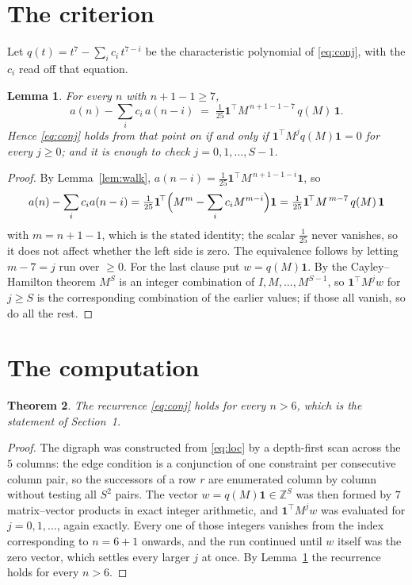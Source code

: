 \documentclass[11pt,a4paper]{article}
\theoremstyle{plain}
\newtheorem{theorem}{Theorem}
\newtheorem{lemma}[theorem]{Lemma}
\theoremstyle{definition}
\begin{document}
\section{The criterion}

Let $q(t)=t^{7}-\sum_i c_i\,t^{7-i}$ be the characteristic polynomial of
\eqref{eq:conj}, with the $c_i$ read off that equation.

\begin{lemma}\label{lem:crit}
For every $n$ with $n+1-1\ge7$,
\[
a(n)-\sum_i c_i\,a(n-i)\;=\;\tfrac1{25}\mathbf{1}^{\!\top}M^{\,n+1-1-7}\,q(M)\,\mathbf{1} .
\]
Hence \eqref{eq:conj} holds from that point on if and only if
$\mathbf{1}^{\!\top}M^{j}q(M)\mathbf{1}=0$ for every $j\ge0$; and it is enough to check
$j=0,1,\dots,S-1$.
\end{lemma}

\begin{proof}
By Lemma~\ref{lem:walk}, $a(n-i)=\tfrac1{25}\mathbf{1}^{\!\top}M^{\,n+1-1-i}\mathbf{1}$, so
\[
a(n)-\sum_i c_i a(n-i)
=\tfrac1{25}\mathbf{1}^{\!\top}\Bigl(M^{m}-\sum_i c_i M^{m-i}\Bigr)\mathbf{1}
=\tfrac1{25}\mathbf{1}^{\!\top}M^{\,m-7}\,q(M)\,\mathbf{1}
\]
with $m=n+1-1$, which is the stated identity; the scalar $\tfrac1{25}$ never vanishes, so
it does not affect whether the left side is zero. The equivalence follows by letting
$m-7=j$ run over $\ge0$. For the last clause put $w=q(M)\mathbf{1}$. By the
Cayley--Hamilton theorem $M^{S}$ is an integer combination of $I,M,\dots,M^{S-1}$, so
$\mathbf{1}^{\!\top}M^{j}w$ for $j\ge S$ is the corresponding combination of the earlier
values; if those all vanish, so do all the rest.
\end{proof}

\section{The computation}

\begin{theorem}
The recurrence \eqref{eq:conj} holds for every $n>6$, which is the statement of
Section~1.
\end{theorem}

\begin{proof}
The digraph was constructed from \eqref{eq:loc} by a depth-first scan across the $5$
columns: the edge condition is a conjunction of one constraint per consecutive column
pair, so the successors of a row $r$ are enumerated column by column without testing all
$S^2$ pairs. The vector $w=q(M)\mathbf{1}\in\mathbb{Z}^{S}$ was then formed by $7$
matrix--vector products in exact integer arithmetic, and $\mathbf{1}^{\!\top}M^{j}w$ was
evaluated for $j=0,1,\dots$, again exactly. Every one of those integers vanishes from the
index corresponding to $n=6+1$ onwards, and the run continued until $w$ itself was the
zero vector, which settles every larger $j$ at once. By Lemma~\ref{lem:crit} the recurrence
holds for every $n>6$.
\end{proof}
\end{document}

